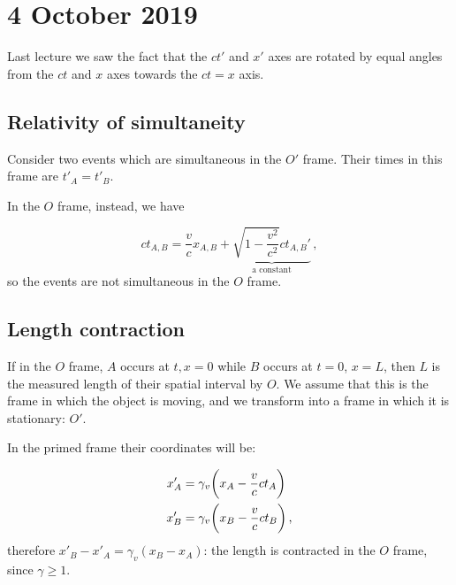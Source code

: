 \documentclass[main.tex]{subfiles}
\begin{document}
\section*{4 October 2019}

Last lecture we saw the fact that the \(ct'\) and \(x'\) axes are rotated by equal angles from the \(ct\) and \(x\) axes towards the \(ct=x\) axis.

\subsection{Relativity of simultaneity}

Consider two events which are simultaneous in the \(O'\) frame. Their times in this frame are \(t'_A = t'_B\).

In the \(O\) frame, instead, we have

\begin{equation}
ct_{A, B} = \frac{v}{c} x_{A, B} + \underbrace{\sqrt{1- \frac{v^2}{c^2} } c t_{A, B}'}_{\text{a constant}}\,,
\end{equation}
%
so the events are not simultaneous in the \(O\) frame.

\subsection{Length contraction}

If in the \(O\) frame, \(A\) occurs at \(t, x = 0\) while \(B\) occurs at \(t=0\), \(x=L\), then \(L\) is the measured length of their spatial interval by \(O\). We assume that this is the frame in which the object is moving, and we transform into a frame in which it is stationary: \(O'\).

In the primed frame their coordinates will be:

\begin{subequations}
\begin{align}
  x'_A &= \gamma_v \qty(x_A - \frac{v}{c} c t_A) \\
  x'_B &= \gamma_v \qty(x_B - \frac{v}{c} c t_B) \,,
\end{align}
\end{subequations}
%
therefore \(x'_B - x'_A = \gamma_v (x_B - x_A)\): the length is contracted in the \(O\) frame, since \(\gamma\geq 1\).

\end{document}
